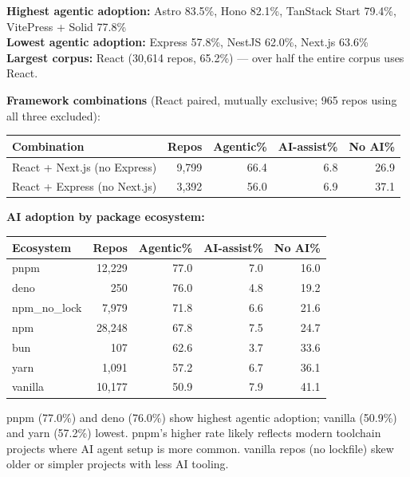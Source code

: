 \documentclass[10pt,a4paper]{article}
\begin{document}
\vspace{6pt}
\textbf{Highest agentic adoption:} Astro 83.5\%, Hono 82.1\%, TanStack Start 79.4\%, VitePress + Solid 77.8\%\\
\textbf{Lowest agentic adoption:} Express 57.8\%, NestJS 62.0\%, Next.js 63.6\%\\
\textbf{Largest corpus:} React (30,614 repos, 65.2\%) --- over half the entire corpus uses React.

\vspace{6pt}
\textbf{Framework combinations} (React paired, mutually exclusive; 965 repos using all three excluded):

\vspace{3pt}
\begin{tabular}{@{}lrrrr@{}}
\toprule
Combination & Repos & Agentic\% & AI-assist\% & No AI\% \\
\midrule
React + Next.js (no Express) & 9,799 & 66.4 & 6.8 & 26.9 \\
React + Express (no Next.js) & 3,392 & 56.0 & 6.9 & 37.1 \\
\bottomrule
\end{tabular}

\vspace{6pt}
\textbf{AI adoption by package ecosystem:}

\vspace{3pt}
\begin{tabular}{@{}lrrrr@{}}
\toprule
Ecosystem & Repos & Agentic\% & AI-assist\% & No AI\% \\
\midrule
pnpm          & 12,229 & 77.0 & 7.0 & 16.0 \\
deno          &    250 & 76.0 & 4.8 & 19.2 \\
npm\_no\_lock &  7,979 & 71.8 & 6.6 & 21.6 \\
npm           & 28,248 & 67.8 & 7.5 & 24.7 \\
bun           &    107 & 62.6 & 3.7 & 33.6 \\
yarn          &  1,091 & 57.2 & 6.7 & 36.1 \\
vanilla       & 10,177 & 50.9 & 7.9 & 41.1 \\
\bottomrule
\end{tabular}

\vspace{4pt}
{\small pnpm (77.0\%) and deno (76.0\%) show highest agentic adoption; vanilla (50.9\%) and yarn (57.2\%) lowest.
pnpm's higher rate likely reflects modern toolchain projects where AI agent setup is more common.
vanilla repos (no lockfile) skew older or simpler projects with less AI tooling.}
\end{document}
